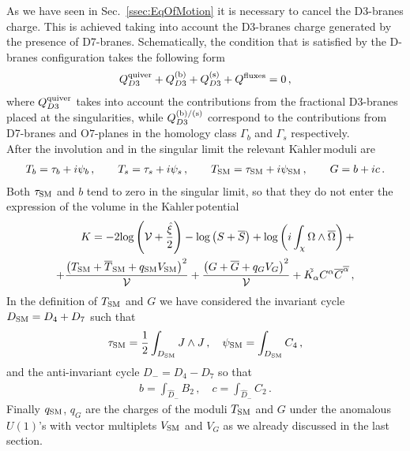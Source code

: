\documentclass[12pt,a4paper]{book}
\newcommand{\Kahler}{\ensuremath{\text{K}\ddot{\text{a}}\text{hler}\,}}
\newcommand{\V}{{\cal{V}}}
\begin{document}
As we have seen in Sec.~\ref{ssec:EqOfMotion} it is necessary to cancel the D3-branes charge. This is achieved taking into account the D3-branes charge generated by the presence of D7-branes. Schematically, the condition that is satisfied by the D-branes configuration takes the following form
\begin{align}
\label{eq:D3ChargeCancellationExplicit}
Q^{\rm quiver}_{D3} + Q^{\rm (b)}_{D3} + Q^{\rm (s)}_{D3} + Q^{\rm fluxes} = 0\,,
\end{align}
where $Q^{\rm quiver}_{D3}$ takes into account the contributions from the fractional D3-branes placed at the singularities, while $Q^{\rm (b)/(s)}_{D3}$ correspond to the contributions from D7-branes and O$7$-planes in the homology class $\Gamma_b$ and $\Gamma_s$ respectively.\\

After the involution and in the singular limit the relevant \Kahler moduli are
\begin{align}
\label{eq:KahlerModuliPaper}
T_b = \tau_b + i \psi_b \,, \qquad T_s = \tau_s + i \psi_s \,, \qquad T_{\rm SM} = \tau_{\rm SM} + i \psi_{\rm SM} \,, \qquad G = b + i c \,.
\end{align}
Both $\tau_{\rm SM}$ and $b$ tend to zero in the singular limit, so that they do not enter the expression of the volume in the \Kahler potential
\begin{align}
\label{eq:KahlerPotentialExplicit}
K = - 2 \text{log} \left(\V + \frac{\hat{\xi}}{2}\right) - \text{log} \left(S + \overline{S}\right) + \text{log} \left(i \int_\chi \Omega \wedge \overline{\Omega}\right) + \nonumber \\
+ \frac{\left(T_{\rm SM} + \overline{T}_{\rm SM} + q_{\rm SM} V_{\rm SM}\right)^2}{\V} + \frac{\left(G + \overline{G} + q_G V_G\right)^2}{\V} + \tilde{K_\alpha} C^\alpha \overline{C}^{\overline{\alpha}}\,,
\end{align}
In the definition of $T_{\rm SM}$ and $G$ we have considered the invariant cycle $D_{\rm SM} = D_4 + D_7$ such that
\begin{align}
\label{eq:InvariantCycle}
\tau_{\rm SM} = \frac{1}{2} \int_{D_{\rm SM}} J \wedge J \,, \quad \psi_{\rm SM} = \int_{D_{\rm SM}} C_4 \,,
\end{align}
and the anti-invariant cycle $D_- = D_4 - D_7$ so that
\begin{align}
\label{eq:AntiInvariantCycle}
b = \int_{\hat{D}_-} B_2 \,, \quad c = \int_{\hat{D}_-} C_2 \,.
\end{align}
Finally $q_{\rm SM}$, $q_G$ are the charges of the moduli $T_{\rm SM}$ and $G$ under the anomalous $U(1)$'s with vector multiplets $V_{\rm SM}$ and $V_G$ as we already discussed in the last section.\\
\end{document}
